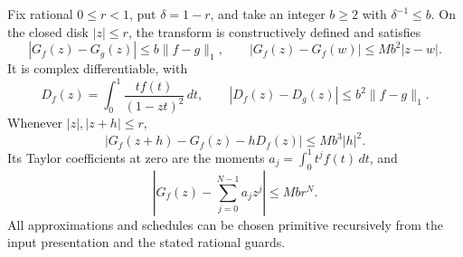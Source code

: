 \begin{theorem}
Fix rational \(0\leq r<1\), put \(\delta=1-r\), and take an integer
\(b\geq2\) with \(\delta^{-1}\leq b\). On the closed disk
\(|z|\leq r\), the transform is constructively defined and satisfies
\[
 |G_f(z)-G_g(z)|\leq b\|f-g\|_1,
 \qquad
 |G_f(z)-G_f(w)|\leq Mb^2|z-w|.
 \label{eq:g-stability}\tag{GS}
\]
It is complex differentiable, with
\[
 D_f(z)=\int_0^1\frac{t f(t)}{(1-zt)^2}\,dt,
 \qquad
 |D_f(z)-D_g(z)|\leq b^2\|f-g\|_1.
\]
Whenever \(|z|,|z+h|\leq r\),
\begin{equation}
 |G_f(z+h)-G_f(z)-hD_f(z)|\leq Mb^3|h|^2.
 \label{eq:g-derivative}
\end{equation}
Its Taylor coefficients at zero are the moments
\(a_j=\int_0^1t^jf(t)\,dt\), and
\begin{equation}
 \left|G_f(z)-\sum_{j=0}^{N-1}a_jz^j\right|
       \leq Mb r^N.
 \label{eq:g-taylor}
\end{equation}
All approximations and schedules can be chosen primitive recursively
from the input presentation and the stated rational guards.
\end{theorem}

